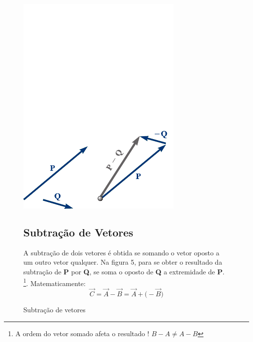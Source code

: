 \documentclass[a4paper, 14pt, twoside]{article}
\begin{document}
    \begin{figure}[h]
        \begin{minipage}[t]{0.4\textwidth}
            \vspace{-4cm} %
            \centering
            \includegraphics[width=0.9\linewidth]{Figuras/somavec.pdf}
            \caption{Subtração de vetores}
        \end{minipage}%
        \hfill %
        \begin{minipage}[t]{0.60\textwidth}
            \vspace{0pt} %
            \subsection{Subtração de Vetores} %
            \vspace{1cm}
            \begin{tcolorbox}[colframe=lockheed, colback=white, title=Subtração de Vetores, fonttitle=\bfseries]
                A subtração de dois vetores é obtida se somando o vetor oposto a um outro vetor qualquer. Na figura 5, para se obter o resultado da subtração de \textbf{P} por \textbf{Q}, se soma o oposto de \textbf{Q} a extremidade de \textbf{P}. \footnote{A ordem do vetor somado afeta o resultado ! $B - A \neq A -B$}. Matematicamente: 
                \[\vec{C} = \vec{A} - \vec{B} = \vec{A} + \biggl(-\vec{B}\biggr)\]
            \end{tcolorbox}
        \end{minipage}
    \end{figure}
\end{document}
